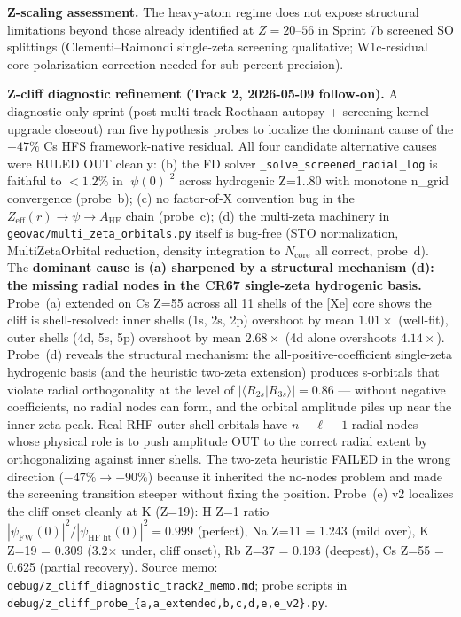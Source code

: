 \documentclass[11pt]{article}
\begin{document}
\textbf{Z-scaling assessment.}  The heavy-atom regime does not expose
structural limitations beyond those already identified at $Z=20$--$56$
in Sprint 7b screened SO splittings (Clementi--Raimondi single-zeta
screening qualitative; W1c-residual core-polarization correction
needed for sub-percent precision).

\textbf{Z-cliff diagnostic refinement (Track 2, 2026-05-09 follow-on).}
A diagnostic-only sprint (post-multi-track Roothaan autopsy + screening
kernel upgrade closeout) ran five hypothesis probes to localize the
dominant cause of the $-47\%$ Cs HFS framework-native residual.  All
four candidate alternative causes were RULED OUT cleanly: (b) the FD
solver \texttt{\_solve\_screened\_radial\_log} is faithful to $<1.2\%$
in $|\psi(0)|^2$ across hydrogenic Z=1..80 with monotone n\_grid
convergence (probe~b); (c) no factor-of-X convention bug in the
$Z_\text{eff}(r) \to \psi \to A_\text{HF}$ chain (probe~c); (d) the
multi-zeta machinery in \texttt{geovac/multi\_zeta\_orbitals.py}
itself is bug-free (STO normalization, MultiZetaOrbital reduction,
density integration to $N_\text{core}$ all correct, probe~d).  The
\textbf{dominant cause is (a) sharpened by a structural mechanism (d):
the missing radial nodes in the CR67 single-zeta hydrogenic basis.}
Probe~(a) extended on Cs Z=55 across all 11 shells of the [Xe] core
shows the cliff is shell-resolved: inner shells (1s, 2s, 2p) overshoot
by mean $1.01\times$ (well-fit), outer shells (4d, 5s, 5p) overshoot
by mean $2.68\times$ (4d alone overshoots $4.14\times$).  Probe~(d)
reveals the structural mechanism: the all-positive-coefficient
single-zeta hydrogenic basis (and the heuristic two-zeta extension)
produces s-orbitals that violate radial orthogonality at the level of
$|\langle R_{2s}|R_{3s}\rangle| = 0.86$ --- without negative
coefficients, no radial nodes can form, and the orbital amplitude
piles up near the inner-zeta peak.  Real RHF outer-shell orbitals
have $n - \ell - 1$ radial nodes whose physical role is to push
amplitude OUT to the correct radial extent by orthogonalizing against
inner shells.  The two-zeta heuristic FAILED in the wrong direction
($-47\% \to -90\%$) because it inherited the no-nodes problem and
made the screening transition steeper without fixing the position.
Probe~(e) v2 localizes the cliff onset cleanly at K (Z=19): H Z=1
ratio $|\psi_\text{FW}(0)|^2 / |\psi_\text{HF lit}(0)|^2 = 0.999$
(perfect), Na Z=11 = 1.243 (mild over), K Z=19 = 0.309 (3.2$\times$
under, cliff onset), Rb Z=37 = 0.193 (deepest), Cs Z=55 = 0.625
(partial recovery).  Source memo:
\texttt{debug/z\_cliff\_diagnostic\_track2\_memo.md}; probe scripts in
\texttt{debug/z\_cliff\_probe\_\{a,a\_extended,b,c,d,e,e\_v2\}.py}.
\end{document}
